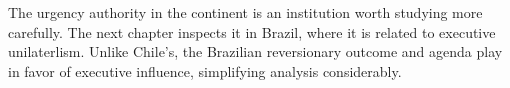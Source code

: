 \documentclass[letter,12pt]{article}
\begin{document}
The urgency authority in the continent is an institution worth studying more carefully. The next chapter inspects it in Brazil, where it is related to executive unilaterlism. Unlike Chile's, the Brazilian reversionary outcome and agenda play in favor of executive influence, simplifying analysis considerably.

\end{document}
